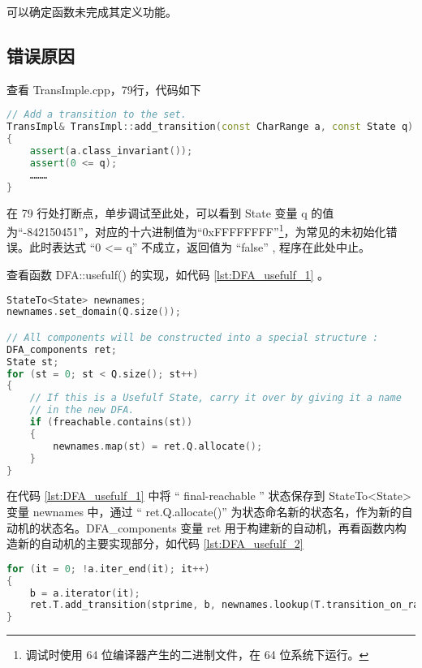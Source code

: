 可以确定函数未完成其定义功能。

\subsection{错误原因}

查看 TransImple.cpp，79行，代码如下
\lstset{style=mystyle}
\begin{lstlisting}[language=C++,label={lst:TransImple},caption={ TransImple.cpp },firstnumber=75]
// Add a transition to the set.
TransImpl& TransImpl::add_transition(const CharRange a, const State q)
{
    assert(a.class_invariant());
    assert(0 <= q);
    ………
}
\end{lstlisting}

在 79 行处打断点，单步调试至此处，可以看到 State 变量 q 的值为“-842150451”，对应的十六进制值为“0xFFFFFFFF”\footnote{调试时使用 64 位编译器产生的二进制文件，在 64 位系统下运行。}，为常见的未初始化错误。此时表达式 “0 <= q” 不成立，返回值为 “false” , 程序在此处中止。

查看函数 DFA::usefulf() 的实现，如代码 \ref{lst:DFA_usefulf_1} 。
\lstset{style=mystyle}
\begin{lstlisting}[language=C++,label={lst:DFA_usefulf_1},caption={ DFA.cpp },firstnumber=84]
StateTo<State> newnames;
newnames.set_domain(Q.size());

// All components will be constructed into a special structure :
DFA_components ret;
State st;
for (st = 0; st < Q.size(); st++)
{
    // If this is a Usefulf State, carry it over by giving it a name
    // in the new DFA.
    if (freachable.contains(st))
    {
        newnames.map(st) = ret.Q.allocate();
    }
}
\end{lstlisting}
在代码 \ref{lst:DFA_usefulf_1} 中将 “ final-reachable ” 状态保存到 StateTo<State> 变量 newnames 中，通过 “ ret.Q.allocate()” 为状态命名新的状态名，作为新的自动机的状态名。DFA\_components 变量 ret 用于构建新的自动机，再看函数内构造新的自动机的主要实现部分，如代码 \ref{lst:DFA_usefulf_2}
\lstset{style=mystyle}
\begin{lstlisting}[language=C++,label={lst:DFA_usefulf_2},caption={ DFA.cpp },firstnumber=130]
for (it = 0; !a.iter_end(it); it++)
{
    b = a.iterator(it);
    ret.T.add_transition(stprime, b, newnames.lookup(T.transition_on_range(st, b)));
}
\end{lstlisting}

